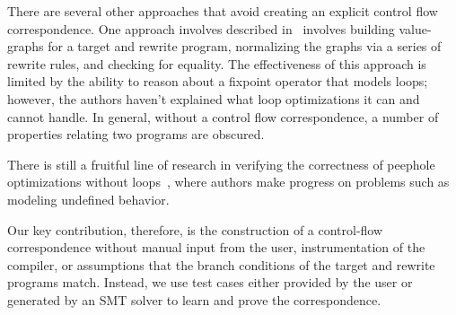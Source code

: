 
There are several other approaches that avoid creating an explicit
control flow correspondence. One approach involves described
in~\cite{Tristan2011} involves building value-graphs for a target and
rewrite program, normalizing the graphs via a series of rewrite rules,
and checking for equality. The effectiveness of this approach is
limited by the ability to reason about a fixpoint operator that models
loops; however, the authors haven't explained what loop optimizations
it can and cannot handle. In general, without a control flow correspondence, a
number of properties relating two programs are obscured.

There is still a fruitful line of research in verifying the
correctness of peephole optimizations without loops~\cite{Lopes2015},
where authors make progress on problems such as modeling undefined
behavior.

Our key contribution, therefore, is the construction of a control-flow
correspondence without manual input from the user, instrumentation
of the compiler, or assumptions that the branch conditions of the
target and rewrite programs match. Instead, we use test cases either
provided by the user or generated by an SMT solver to learn and prove
the correspondence.

